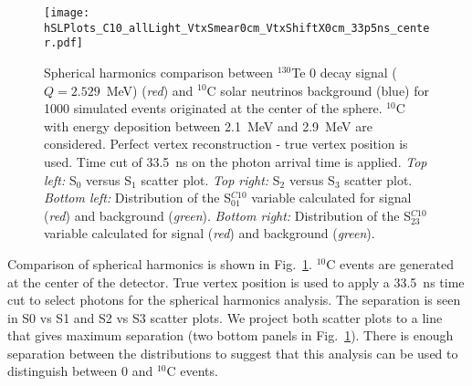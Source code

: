 \begin{figure}[h]
  \centering
  \texttt{[image: hSLPlots\_C10\_allLight\_VtxSmear0cm\_VtxShiftX0cm\_33p5ns\_center.pdf]}
  \caption{Spherical harmonics comparison between $^{130}$Te 0{\nbb}
    decay signal ($Q=2.529$~MeV) (\emph{red}) and $^{10}$C solar
    neutrinos background (blue) for 1000 simulated events originated
    at the center of the sphere. $^{10}$C with energy deposition
    between 2.1~MeV and 2.9~MeV are considered. Perfect vertex
    reconstruction - true vertex position is used. Time cut of 33.5~ns
    on the photon arrival time is applied. \emph{Top left:} S$_0$
    versus S$_1$ scatter plot. \emph{Top right:} S$_2$ versus S$_3$
    scatter plot. \emph{Bottom left:} Distribution of the
    S$^{C10}_{01}$ variable calculated for signal (\emph{red}) and
    background (\emph{green}). \emph{Bottom right:} Distribution of
    the S$^{C10}_{23}$ variable calculated for signal (\emph{red}) and
    background (\emph{green}).}
  \label{fig:SL_C10_33p5ns_center}
\end{figure}


Comparison of spherical harmonics is shown in
Fig.~\ref{fig:SL_C10_33p5ns_center}. $^{10}$C events are generated at
the center of the detector. True vertex position is used to apply a
33.5~ns time cut to select photons for the spherical harmonics
analysis. The separation is seen in S0 vs S1 and S2 vs S3 scatter
plots. We project both scatter plots to a line that gives maximum
separation (two bottom panels in Fig.~\ref{fig:SL_C10_33p5ns_center}).  
There is enough separation between the distributions to suggest that this analysis can be used to distinguish between 0{\nbb} and $^{10}$C events.

